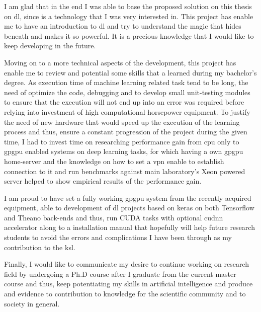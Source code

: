 I am glad that in the end I was able to base the proposed solution on this thesis on \acrshort{dl}, since is a technology that I was very interested in. This project has enable me to have an introduction to \acrshort{dl} and try to understand the magic that hides beneath and makes it so powerful. It is a precious knowledge that I would like to keep developing in the future.

Moving on to a more technical aspects of the development, this project has enable me to review and potential some skills that a learned during my bachelor's degree. As execution time of machine learning related task tend to be long, the need of optimize the code, debugging and to develop small unit-testing modules to ensure that the execution will not end up into an error was required before relying into investment of high computational horsepower equipment. To justify the need of new hardware that would speed up the execution of the learning process and thus, ensure a constant progression of the project during the given time, I had to invest time on researching performance gain from \acrshort{cpu} only to \acrshort{gpgpu} enabled systems on deep learning tasks, for which having a own \acrshort{gpgpu} home-server and the knowledge on how to set a \acrshort{vpn} enable to establish connection to it and run benchmarks against main laboratory's Xeon powered server helped to show empirical results of the performance gain.

I am proud to have set a fully working \acrshort{gpgpu} system from the recently acquired equipment, able to development of \acrshort{dl} projects based on keras \cite{keras} on both Tensorflow and Theano back-ends and thus, run CUDA tasks with optional \acrshort{cudnn} accelerator \cite{chetlur2014cudnn} along to a installation manual that hopefully will help future research students to avoid the errors and complications I have been through as my contribution to the \acrfull{ksl}.

Finally, I would like to communicate my desire to continue working on research field by undergoing a Ph.D course after I graduate from the current master course and thus, keep potentiating my skills in artificial intelligence and produce and evidence to contribution to knowledge for the scientific community and to society in general.

